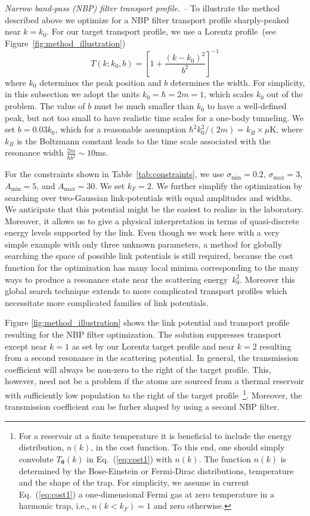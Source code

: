 \documentclass[twocolumn,amsmath,amssymb,showpacs,pra,superscriptaddress,aps]{revtex4-1}
\begin{document}
{\it Narrow band-pass (NBP) filter transport profile. --}
To illustrate the method described above we optimize for a NBP filter transport profile sharply-peaked near $k=k_0$. 
For our target transport profile, we use a Lorentz profile~(see Figure~\ref{fig:method_illustration})
\begin{equation}\label{eq:Ttarget}
  T(k; k_0,b) = \left[1 + \frac{(k-k_0)^2}{b^2}\right]^{-1}
\end{equation}
where $k_0$ determines the peak position and $b$ determines the width. 
For simplicity, in this subsection we adopt the units $k_0=\hbar=2m=1$, which scales $k_0$
out of the problem. The value of $b$ must be much smaller than $k_0$ 
to have a well-defined peak, but not too small to have realistic time scales
for a one-body tunneling. We set $b=0.03 k_0$, which for a reasonable assumption 
$\hbar^2k_0^2/(2m)=k_B\times \mu$K, where $k_B$ is the Boltzmann constant leads to 
the time scale associated with the resonance width $\frac{2m}{\hbar b^2}\sim 10$ms.

 For the constraints shown in Table~\ref{tab:constraints}, we use $\sigma_{\mathrm{min}}=0.2$, $\sigma_{\mathrm{max}}=3$, $A_{\mathrm{min}}=5$, and $A_{\mathrm{max}}=30$. We set $k_F=2$. We further simplify the optimization by searching over two-Gaussian link-potentials with equal amplitudes and widths. We anticipate that this potential might be the easiest to realize in the laboratory. 
Moreover, it allows us to give a physical interpretation in terms of quasi-discrete energy levels supported by the link.  Even though we work here with a very simple example with only three unknown parameters, a method for globally searching the space of possible link potentials is still required, because the cost function for the optimization has many local minima corresponding to the many ways to produce a resonance state near the scattering energy~$k_0^2$. Moreover this global search technique extends to more complicated transport profiles which necessitate more complicated families of link potentials.

Figure \ref{fig:method_illustration} shows the link potential and transport profile resulting for the NBP filter optimization. The solution suppresses transport except near $k=1$ as set by our Lorentz target profile and near $k=2$ resulting from a second resonance in the scattering potential. 
In general, the transmission coefficient will always be non-zero to the right of the target profile. 
This, however, need not be a problem if the atoms are sourced from a thermal reservoir with sufficiently low population to the right of the target profile~\footnote{For a reservoir at a finite temperature it is beneficial to include the energy distribution, $n(k)$,
in the cost function. To this end, one should simply convolute $T_{\bm{\theta}}(k)$ in Eq.~(\ref{eq:cost1}) with $n(k)$. 
The function $n(k)$ is determined by the Bose-Einstein or Fermi-Dirac distributions, temperature and the shape of the trap. For simplicity, 
we assume in current Eq.~(\ref{eq:cost1}) a one-dimensional Fermi gas at zero temperature in a harmonic trap, i.e., $n(k<k_F)=1$ and zero otherwise.}.
Moreover, the transmission coefficient can be furher shaped by using a second NBP filter.
 
\end{document}
